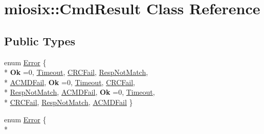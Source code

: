 \hypertarget{classmiosix_1_1_cmd_result}{\section{miosix\-:\-:Cmd\-Result Class Reference}
\label{classmiosix_1_1_cmd_result}
}
\subsection*{Public Types}
\begin{DoxyCompactItemize}
\item 
enum \hyperlink{classmiosix_1_1_cmd_result_a5f41145bee0231a6b1b1db62db692b39}{Error} \{ \\*
{\bfseries Ok} =0, 
\hyperlink{classmiosix_1_1_cmd_result_a5f41145bee0231a6b1b1db62db692b39a4c75ebaaabd66f5512e19a706aab5ca5}{Timeout}, 
\hyperlink{classmiosix_1_1_cmd_result_a5f41145bee0231a6b1b1db62db692b39ab5505004f6181d05498a27752c2d0177}{C\-R\-C\-Fail}, 
\hyperlink{classmiosix_1_1_cmd_result_a5f41145bee0231a6b1b1db62db692b39a592feae533369038bf78bbbdfefbd6d9}{Resp\-Not\-Match}, 
\\*
\hyperlink{classmiosix_1_1_cmd_result_a5f41145bee0231a6b1b1db62db692b39aeb76d06f07d933210850643b08eb635b}{A\-C\-M\-D\-Fail}, 
{\bfseries Ok} =0, 
\hyperlink{classmiosix_1_1_cmd_result_a5f41145bee0231a6b1b1db62db692b39a4c75ebaaabd66f5512e19a706aab5ca5}{Timeout}, 
\hyperlink{classmiosix_1_1_cmd_result_a5f41145bee0231a6b1b1db62db692b39ab5505004f6181d05498a27752c2d0177}{C\-R\-C\-Fail}, 
\\*
\hyperlink{classmiosix_1_1_cmd_result_a5f41145bee0231a6b1b1db62db692b39a592feae533369038bf78bbbdfefbd6d9}{Resp\-Not\-Match}, 
\hyperlink{classmiosix_1_1_cmd_result_a5f41145bee0231a6b1b1db62db692b39aeb76d06f07d933210850643b08eb635b}{A\-C\-M\-D\-Fail}, 
{\bfseries Ok} =0, 
\hyperlink{classmiosix_1_1_cmd_result_a5f41145bee0231a6b1b1db62db692b39a4c75ebaaabd66f5512e19a706aab5ca5}{Timeout}, 
\\*
\hyperlink{classmiosix_1_1_cmd_result_a5f41145bee0231a6b1b1db62db692b39ab5505004f6181d05498a27752c2d0177}{C\-R\-C\-Fail}, 
\hyperlink{classmiosix_1_1_cmd_result_a5f41145bee0231a6b1b1db62db692b39a592feae533369038bf78bbbdfefbd6d9}{Resp\-Not\-Match}, 
\hyperlink{classmiosix_1_1_cmd_result_a5f41145bee0231a6b1b1db62db692b39aeb76d06f07d933210850643b08eb635b}{A\-C\-M\-D\-Fail}
 \}
\item 
enum \hyperlink{classmiosix_1_1_cmd_result_a5f41145bee0231a6b1b1db62db692b39}{Error} \{ \\*

\end{DoxyCompactItemize}
